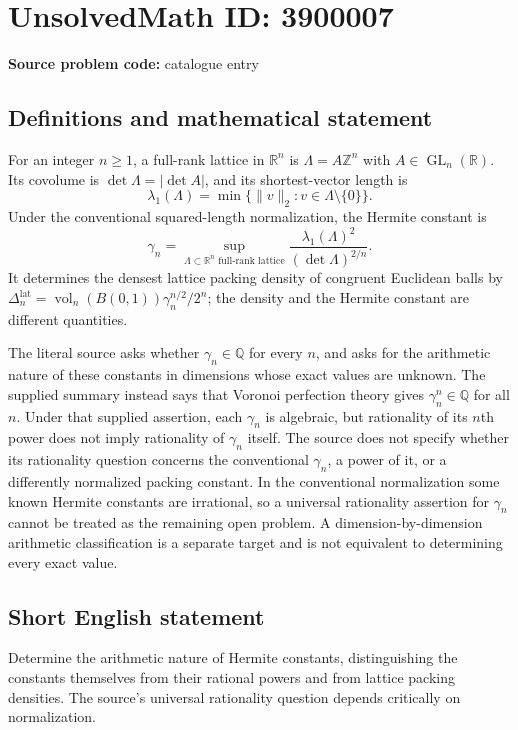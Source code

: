 \documentclass[11pt]{article}
\newcommand{\Z}{\mathbb{Z}}
\newcommand{\Q}{\mathbb{Q}}
\newcommand{\R}{\mathbb{R}}
\begin{document}
\section*{UnsolvedMath ID: 3900007}
\textbf{Source problem code:} catalogue entry
\subsection{Definitions and mathematical statement}
For an integer $n\geq1$, a full-rank lattice in $\R^n$ is $\Lambda=A\Z^n$ with $A\in\operatorname{GL}_n(\R)$. Its covolume is $\det\Lambda=|\det A|$, and its shortest-vector length is
\[
\lambda_1(\Lambda)=\min\{\|v\|_2:v\in\Lambda\setminus\{0\}\}.
\]
Under the conventional squared-length normalization, the Hermite constant is
\[
\gamma_n=\sup_{\Lambda\subset\R^n\text{ full-rank lattice}}
\frac{\lambda_1(\Lambda)^2}{(\det\Lambda)^{2/n}}.
\]
It determines the densest lattice packing density of congruent Euclidean balls by $\Delta_n^{\mathrm{lat}}=\operatorname{vol}_n(B(0,1))\gamma_n^{n/2}/2^n$; the density and the Hermite constant are different quantities.

The literal source asks whether $\gamma_n\in\Q$ for every $n$, and asks for the arithmetic nature of these constants in dimensions whose exact values are unknown. The supplied summary instead says that Voronoi perfection theory gives $\gamma_n^n\in\Q$ for all $n$. Under that supplied assertion, each $\gamma_n$ is algebraic, but rationality of its $n$th power does not imply rationality of $\gamma_n$ itself. The source does not specify whether its rationality question concerns the conventional $\gamma_n$, a power of it, or a differently normalized packing constant. In the conventional normalization some known Hermite constants are irrational, so a universal rationality assertion for $\gamma_n$ cannot be treated as the remaining open problem. A dimension-by-dimension arithmetic classification is a separate target and is not equivalent to determining every exact value.
\subsection{Short English statement}
Determine the arithmetic nature of Hermite constants, distinguishing the constants themselves from their rational powers and from lattice packing densities. The source's universal rationality question depends critically on normalization.
\end{document}
